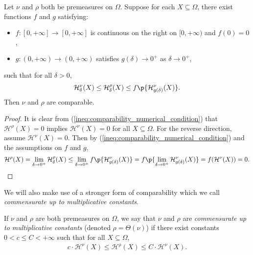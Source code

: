 \begin{lemma}
    \label{lem:comparability_numerical_condition}
    Let $\nu$ and $\rho$ both be premeasures on $\Omega$. Suppose for each $X \subseteq \Omega$, there exist functions $f$ and $g$ satisfying:
    \begin{itemize}
        \item $f: [0, +\infty] \to [0, +\infty]$ is continuous on the right on $[0, +\infty)$ and $f(0) = 0$,
        \item $g: (0, +\infty) \to (0, +\infty)$ satisfies $g(\delta) \to 0^+$ as $ \delta \to 0^+$,
    \end{itemize}
    such that for all $\delta > 0$,
    \begin{align}
        \label{ineq:comparability_numerical_condition}
        \mathcal{H}^\nu_\delta(X) \leq \mathcal{H}^\rho_\delta(X) \leq f\p{\mathcal{H}^\nu_{g(\delta)}(X)}.
    \end{align}
    Then $\nu$ and $\rho$ are comparable.
\end{lemma}
\begin{proof}
    It is clear from (\ref{ineq:comparability_numerical_condition}) that $\mathcal{H}^\rho(X) = 0$ implies $\mathcal{H}^\nu(X) = 0$ for all $X \subseteq \Omega$. For the reverse direction, assume $\mathcal{H}^\nu(X) = 0$. Then by (\ref{ineq:comparability_numerical_condition}) and the assumptions on $f$ and $g$,
    \begin{align*}
        \mathcal{H}^\rho(X) = \lim_{\delta \to 0^+} \mathcal{H}^\rho_\delta(X) \leq \lim_{\delta \to 0^+} f\p{\mathcal{H}^\nu_{g(\delta)}(X)} = f\p{\lim_{\delta \to 0^+} \mathcal{H}^\nu_{g(\delta)}(X)} = f(\mathcal{H}^\nu(X)) = 0.
    \end{align*}
\end{proof}

We will also make use of a stronger form of comparability which we call \textit{commensurate up to multiplicative constants}. 

\begin{definition}
    If $\nu$ and $\rho$ are both premeasures on $\Omega$, we say that $\nu$ and $\rho$ are \textit{commensurate up to multiplicative constants} (denoted $\rho = \Theta(\nu)$) if there exist constants $0 < c \leq C < +\infty$ such that for all $X \subseteq \Omega$, 
    \begin{align*}
        c \cdot \mathcal{H}^\nu(X) \leq \mathcal{H}^\rho(X) \leq C \cdot \mathcal{H}^\nu(X).
    \end{align*}
\end{definition}

